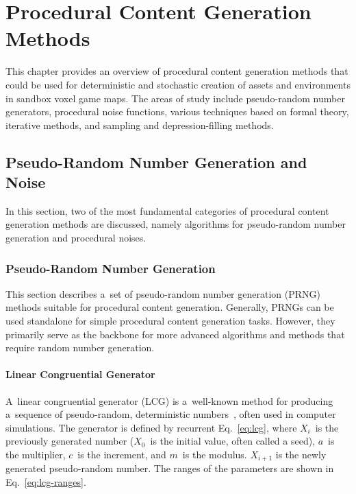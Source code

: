\chapter{Procedural Content Generation Methods}\label{proc-gen-methods}
This chapter provides an overview of procedural content generation methods that could be used for deterministic and stochastic creation of assets and environments in sandbox voxel game maps. The areas of study include pseudo-random number generators, procedural noise functions, various techniques based on formal theory, iterative methods, and sampling and depression-filling methods.

\section{Pseudo-Random Number Generation and Noise}
In this section, two of the most fundamental categories of procedural content generation methods are discussed, namely algorithms for pseudo-random number generation and procedural noises.

\subsection{Pseudo-Random Number Generation}
This section describes a~set of pseudo-random number generation (PRNG) methods suitable for procedural content generation. Generally, PRNGs can be used standalone for simple procedural content generation tasks. However, they primarily serve as the backbone for more advanced algorithms and methods that require random number generation.

\subsubsection*{Linear Congruential Generator}
A~linear congruential generator (LCG) is a~well-known method for producing a~sequence of pseudo-random, deterministic numbers~\cite{linear-congruential-generators-tezuka, peringer-hruby-ims, random-numbers-bikos}, often used in computer simulations. The generator is defined by recurrent Eq.~\ref{eq:lcg}, where $X_i$~is the previously generated number ($X_0$~is the initial value, often called a seed), $a$~is the multiplier, $c$~is the increment, and $m$~is the modulus. $X_{i+1}$ is the newly generated pseudo-random number. The ranges of the parameters are shown in Eq.~\ref{eq:lcg-ranges}.

